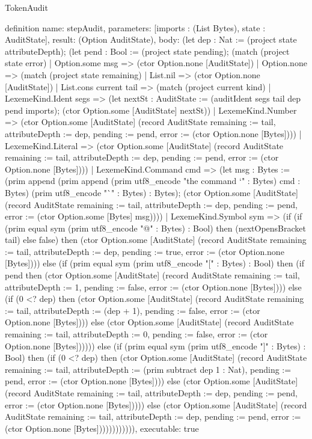 \begin{lexlean}{TokenAudit}
\begin{semanticmodule}
definition{
  name: stepAudit,
  parameters: [imports : (List Bytes), state : AuditState],
  result: (Option AuditState),
  body: (let dep : Nat := (project state attributeDepth); (let pend : Bool := (project state pending); (match (project state error)
    | Option.some msg => (ctor Option.none [AuditState])
    | Option.none => (match (project state remaining)
      | List.nil => (ctor Option.none [AuditState])
      | List.cons current tail => (match (project current kind)
        | LexemeKind.Ident segs => (let nextSt : AuditState := (auditIdent segs tail dep pend imports); (ctor Option.some [AuditState] nextSt))
        | LexemeKind.Number => (ctor Option.some [AuditState] (record AuditState {remaining := tail, attributeDepth := dep, pending := pend, error := (ctor Option.none [Bytes])}))
        | LexemeKind.Literal => (ctor Option.some [AuditState] (record AuditState {remaining := tail, attributeDepth := dep, pending := pend, error := (ctor Option.none [Bytes])}))
        | LexemeKind.Command cmd => (let msg : Bytes := (prim append (prim append (prim utf8_encode "the command `" : Bytes) cmd : Bytes) (prim utf8_encode "`" : Bytes) : Bytes); (ctor Option.some [AuditState] (record AuditState {remaining := tail, attributeDepth := dep, pending := pend, error := (ctor Option.some [Bytes] msg)})))
        | LexemeKind.Symbol sym => (if (if (prim equal sym (prim utf8_encode "@" : Bytes) : Bool) then (nextOpensBracket tail) else false) then (ctor Option.some [AuditState] (record AuditState {remaining := tail, attributeDepth := dep, pending := true, error := (ctor Option.none [Bytes])})) else (if (prim equal sym (prim utf8_encode "[" : Bytes) : Bool) then (if pend then (ctor Option.some [AuditState] (record AuditState {remaining := tail, attributeDepth := 1, pending := false, error := (ctor Option.none [Bytes])})) else (if (0 <? dep) then (ctor Option.some [AuditState] (record AuditState {remaining := tail, attributeDepth := (dep + 1), pending := false, error := (ctor Option.none [Bytes])})) else (ctor Option.some [AuditState] (record AuditState {remaining := tail, attributeDepth := 0, pending := false, error := (ctor Option.none [Bytes])})))) else (if (prim equal sym (prim utf8_encode "]" : Bytes) : Bool) then (if (0 <? dep) then (ctor Option.some [AuditState] (record AuditState {remaining := tail, attributeDepth := (prim subtract dep 1 : Nat), pending := pend, error := (ctor Option.none [Bytes])})) else (ctor Option.some [AuditState] (record AuditState {remaining := tail, attributeDepth := dep, pending := pend, error := (ctor Option.none [Bytes])}))) else (ctor Option.some [AuditState] (record AuditState {remaining := tail, attributeDepth := dep, pending := pend, error := (ctor Option.none [Bytes])})))))))))),
  executable: true
}


\end{semanticmodule}
\end{lexlean}
